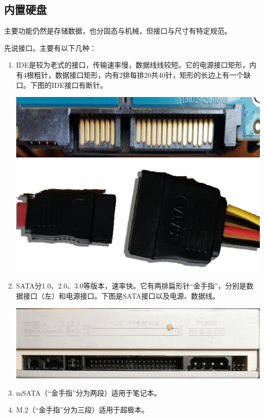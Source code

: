 \subsection{内置硬盘}
主要功能仍然是存储数据，也分固态与机械，但接口与尺寸有特定规范。\par
先说接口。主要有以下几种：
\begin{enumerate}
\item IDE是较为老式的接口，传输速率慢，数据线线较短。它的电源接口矩形，内有4根粗针，数据接口矩形，内有2排每排20共40针，矩形的长边上有一个缺口。下图的IDE接口有断针。
\begin{center}
	\includegraphics[scale=0.05]{pic/sata}\\\includegraphics[scale=0.15]{pic/SATA-Lines}	
\end{center}
\item SATA分1.0、2.0、3.0等版本，速率快。它有两排扁形针“金手指”，分别是数据接口（左）和电源接口。下图是SATA接口以及电源、数据线。
\begin{center}
	\includegraphics[scale=0.05]{pic/IDE}
\end{center}
\item mSATA（“金手指”分为两段）适用于笔记本。
\item M.2（“金手指”分为三段）适用于超极本。
\end{enumerate}
